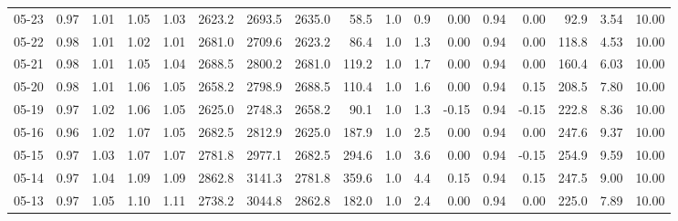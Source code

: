 \begin{threeparttable}
{\begin{tabular}{lrrrrrrrrrrrrrrrr}
  05-23 &         0.97 &           1.01 &          1.05 &          1.03 & 2623.2 & 2693.5 & 2635.0 &       58.5 &                      1.0 &                 0.9 &       0.00 &      0.94 &           0.00 &             92.9 &            3.54 &                  10.00 \\
  05-22 &         0.98 &           1.01 &          1.02 &          1.01 & 2681.0 & 2709.6 & 2623.2 &       86.4 &                      1.0 &                 1.3 &       0.00 &      0.94 &           0.00 &            118.8 &            4.53 &                  10.00 \\
  05-21 &         0.98 &           1.01 &          1.05 &          1.04 & 2688.5 & 2800.2 & 2681.0 &      119.2 &                      1.0 &                 1.7 &       0.00 &      0.94 &           0.00 &            160.4 &            6.03 &                  10.00 \\
  05-20 &         0.98 &           1.01 &          1.06 &          1.05 & 2658.2 & 2798.9 & 2688.5 &      110.4 &                      1.0 &                 1.6 &       0.00 &      0.94 &           0.15 &            208.5 &            7.80 &                  10.00 \\
  05-19 &         0.97 &           1.02 &          1.06 &          1.05 & 2625.0 & 2748.3 & 2658.2 &       90.1 &                      1.0 &                 1.3 &      -0.15 &      0.94 &          -0.15 &            222.8 &            8.36 &                  10.00 \\
  05-16 &         0.96 &           1.02 &          1.07 &          1.05 & 2682.5 & 2812.9 & 2625.0 &      187.9 &                      1.0 &                 2.5 &       0.00 &      0.94 &           0.00 &            247.6 &            9.37 &                  10.00 \\
  05-15 &         0.97 &           1.03 &          1.07 &          1.07 & 2781.8 & 2977.1 & 2682.5 &      294.6 &                      1.0 &                 3.6 &       0.00 &      0.94 &          -0.15 &            254.9 &            9.59 &                  10.00 \\
  05-14 &         0.97 &           1.04 &          1.09 &          1.09 & 2862.8 & 3141.3 & 2781.8 &      359.6 &                      1.0 &                 4.4 &       0.15 &      0.94 &           0.15 &            247.5 &            9.00 &                  10.00 \\
  05-13 &         0.97 &           1.05 &          1.10 &          1.11 & 2738.2 & 3044.8 & 2862.8 &      182.0 &                      1.0 &                 2.4 &       0.00 &      0.94 &           0.00 &            225.0 &            7.89 &                  10.00 \\

\end{tabular}}
\end{threeparttable}
